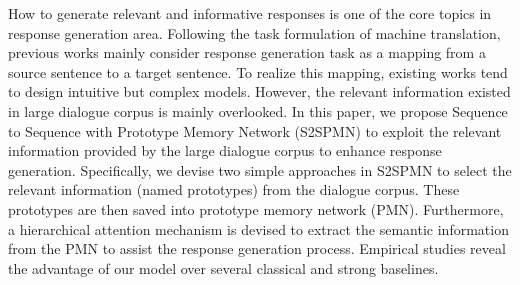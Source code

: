 How to generate relevant and informative responses is one of the core topics in response generation area. Following the task formulation of machine translation, previous works mainly consider response generation task as a mapping from a source sentence to a target sentence. To realize this mapping, existing works tend to design intuitive but complex models. However, the relevant information existed in large dialogue corpus is mainly overlooked. In this paper, we propose Sequence to Sequence with Prototype Memory Network (S2SPMN) to exploit the relevant information provided by the large dialogue corpus to enhance response generation. Specifically, we devise two simple approaches in S2SPMN to select the relevant information (named prototypes) from the dialogue corpus. These prototypes are then saved into prototype memory network (PMN). Furthermore, a hierarchical attention mechanism is devised to extract the semantic information from the PMN to assist the response generation process. Empirical studies reveal the advantage of our model over several classical and strong baselines.
